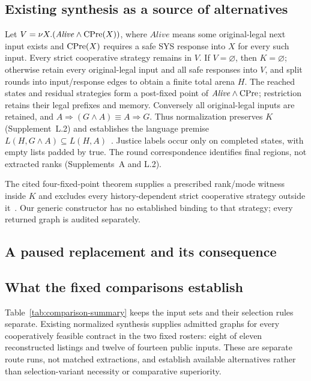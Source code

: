 \subsection{Existing synthesis as a source of alternatives}\label{sec:cooperation}
Let $V=\nu X.(\mathit{Alive}\land\operatorname{CPre}(X))$, where $\mathit{Alive}$
means some original-legal next input exists and $\operatorname{CPre}(X)$ requires a
safe SYS response into $X$ for every such input. Every strict cooperative
strategy remains in $V$. If $V=\varnothing$, then $K=\varnothing$;
otherwise retain every original-legal input and all safe responses into
$V$, and split rounds into input/response edges to obtain a finite total
arena $H$. The reached states and residual strategies form a post-fixed point
of $\mathit{Alive}\land\operatorname{CPre}$; restriction retains their legal prefixes
and memory. Conversely all original-legal inputs are retained, and
$A\Rightarrow(G\land A)\equiv A\Rightarrow G$. Thus normalization
preserves $K$ (Supplement~L.2) and establishes the language premise
$L(H,G\land A)\subseteq L(H,A)$~\cite{cooperative,friendly}.
Justice labels occur only on completed states, with empty lists padded
by true. The round correspondence identifies final regions, not
extracted ranks (Supplements~A and L.2).

The cited four-fixed-point theorem supplies a prescribed rank/mode
witness inside $K$ and excludes every history-dependent strict
cooperative strategy outside it~\cite[Eq.~(18), Theorem~3,
Apps.~B.1--B.2]{friendly}. Our generic constructor has no established
binding to that strategy; every returned graph is audited separately.


\subsection{A paused replacement and its consequence}\label{sec:lift-episode}


\subsection{What the fixed comparisons establish}
Table~\ref{tab:comparison-summary} keeps the input sets and their
selection rules separate. Existing normalized synthesis supplies admitted
graphs for every cooperatively feasible contract in the two fixed rosters:
eight of eleven reconstructed listings and twelve of fourteen public inputs. These are separate
route runs, not matched extractions, and establish available alternatives
rather than selection-variant necessity or comparative superiority.

